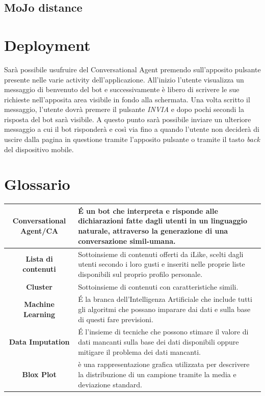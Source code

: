 \documentclass[a4paper, 10pt]{report}
\begin{document}
        \section{MoJo distance}\label{sec:mojo-distance}


    \chapter{Deployment}\label{ch:deployment}

        Sarà possibile usufruire del Conversational Agent premendo sull'apposito pulsante presente nelle varie activity dell'applicazione.
        All'inizio l'utente visualizza un messaggio di benvenuto del bot e successivamente è libero di scrivere le sue
        richieste nell'apposita area visibile in fondo alla schermata. Una volta scritto il messaggio, l'utente dovrà premere il pulsante
        \textit{INVIA} e dopo pochi secondi la risposta del bot sarà visibile. A questo punto sarà possibile inviare un ulteriore messaggio a cui
        il bot risponderà e così via fino a quando l'utente non deciderà di uscire dalla pagina in questione tramite l'apposito pulsante
        o tramite il tasto \textit{back} del dispositivo mobile.


    \chapter{Glossario}\label{ch:glossario}
        \begin{adjustbox}{width=\columnwidth,center}
            \begin{tabular}{|>{\columncolor{Goldenrod}}c|p{8cm}|}
                \hline \textbf{Conversational Agent/CA} & É un bot che interpreta e risponde alle dichiarazioni fatte dagli utenti
                in un linguaggio naturale, attraverso la  generazione di una conversazione simil-umana.\\
                \hline \textbf{Lista di contenuti} & Sottoinsieme di contenuti offerti da iLike, scelti dagli utenti secondo i loro gusti
                e inseriti nelle proprie liste disponibili sul proprio profilo personale.\\
                \hline \textbf{Cluster} & Sottoinsieme di contenuti con caratteristiche simili.\\
                \hline \textbf{Machine Learning} & É la branca dell'Intelligenza Artificiale che include tutti gli algoritmi
                che possano imparare dai dati e sulla base di questi fare previsioni.\\
                \hline \textbf{Data Imputation} & É l'insieme di tecniche che possono stimare il valore di dati mancanti
                sulla base dei dati disponibili oppure mitigare il problema dei dati mancanti.\\
                \hline \textbf{Blox Plot} & è una rappresentazione grafica utilizzata per descrivere la distribuzione di un campione
                tramite la media e deviazione standard.\\
                \hline
            \end{tabular}
        \end{adjustbox}
\end{document}
